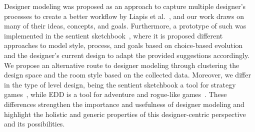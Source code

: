 


Designer modeling was proposed as an approach to capture multiple designer's processes to create a better workflow by Liapis et al.~, and our work draws on many of their ideas, concepts, and goals. Furthermore, a prototype of such was implemented in the sentient sketchbook~, where it is proposed different approaches to model style, process, and goals based on choice-based evolution and the designer's current design to adapt the provided suggestions accordingly. We propose an alternative route to designer modeling through clustering the design space and the room style based on the collected data. Moreover, we differ in the type of level design, being the sentient sketchbook a tool for strategy games~, while EDD is a tool for adventure and rogue-like games~. These differences strengthen the importance and usefulness of designer modeling and highlight the holistic and generic properties of this designer-centric perspective and its possibilities.

